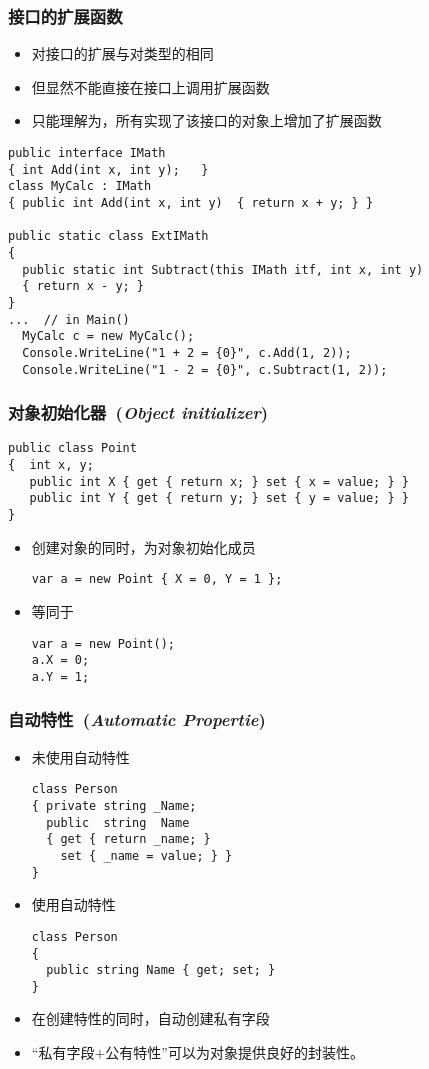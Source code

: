 \begin{frame}[fragile]
\frametitle{接口的扩展函数}
\begin{itemize}
\item 对接口的扩展与对类型的相同
\item 但显然不能直接在接口上调用扩展函数
\item 只能理解为，所有实现了该接口的对象上增加了扩展函数
\end{itemize}
\begin{lstlisting}
public interface IMath
{ int Add(int x, int y);   }
class MyCalc : IMath
{ public int Add(int x, int y)  { return x + y; } }

public static class ExtIMath
{
  public static int Subtract(this IMath itf, int x, int y)
  { return x - y; }
}
...  // in Main()
  MyCalc c = new MyCalc();
  Console.WriteLine("1 + 2 = {0}", c.Add(1, 2));
  Console.WriteLine("1 - 2 = {0}", c.Subtract(1, 2));
\end{lstlisting}
\end{frame}

\begin{frame}[fragile]
\frametitle{对象初始化器~(\textit{Object initializer})}
\begin{lstlisting}
public class Point
{  int x, y;
   public int X { get { return x; } set { x = value; } }
   public int Y { get { return y; } set { y = value; } }
}
\end{lstlisting}
\begin{itemize}
\item 创建对象的同时，为对象初始化成员
\begin{lstlisting}
var a = new Point { X = 0, Y = 1 };
\end{lstlisting}
\item 等同于
\begin{lstlisting}
var a = new Point();
a.X = 0;
a.Y = 1;
\end{lstlisting}
\end{itemize}
\end{frame}

\begin{frame}[fragile]
\frametitle{自动特性~(\textit{Automatic Propertie})}
\begin{itemize}
\item 未使用自动特性
\begin{lstlisting}
class Person
{ private string _Name;
  public  string  Name
  { get { return _name; }
    set { _name = value; } }
}
\end{lstlisting}
\pause
\item 使用自动特性
\begin{lstlisting}
class Person
{
  public string Name { get; set; }
}
\end{lstlisting}
\pause
\item 在创建特性的同时，自动创建私有字段
\item “私有字段$+$公有特性”可以为对象提供良好的封装性。
\end{itemize}
\end{frame}

